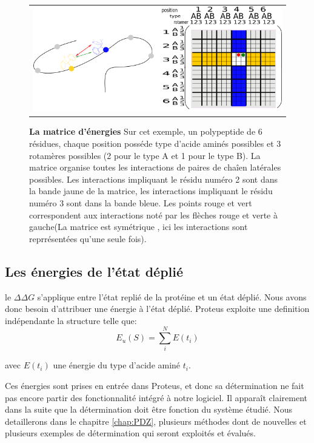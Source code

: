    \begin{figure}[!htbp]
     \centering
     \begin{tabular}{c}
       \includegraphics[width=15cm]{figure/matrice.png}
       \label{Graph:mat_ener}
     \end{tabular}
     
     \caption{\textbf{La matrice d'énergies} Sur cet exemple, un polypeptide de 6 résidues, chaque position posséde type d'acide aminés possibles et 3 rotamères possibles (2 pour le type A et 1 pour le type B). La matrice organise toutes les interactions de paires de chaîen latérales possibles. Les interactions impliquant le résidu numéro 2 sont dans la bande jaune de la matrice, les interactions impliquant le résidu numéro 3 sont dans la bande bleue. Les points rouge et vert correspondent aux interactions  noté par les flèches rouge et verte à gauche(La matrice est symétrique , ici les interactions sont reprrésentées qu'une seule fois).}
\label{graph:MAt_ener}
   \end{figure}
   

\subsection{Les énergies de l'état déplié}

le $\Delta \Delta G$ s'applique entre l'état replié de la protéine et un état déplié. Nous avons donc besoin d'attribuer une énergie à l'état déplié. Proteus exploite une definition indépendante la structure telle que:
\begin{equation}
E_u(S) = \sum_i^N E(t_i)  
\end{equation}

avec $E(t_i)$ une énergie du type d'acide aminé $t_i$.

Ces énergies sont prises en entrée dans Proteus, et donc sa détermination ne fait pas encore partir des fonctionnalité intégré à notre logiciel. Il apparaît clairement dans la suite que la détermination doit être fonction du système étudié. Nous detaillerons dans le chapitre \ref{chap:PDZ}, plusieurs méthodes dont de nouvelles et plusieurs exemples de détermination qui seront exploités et évalués.


